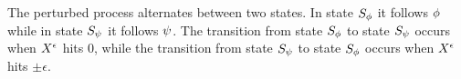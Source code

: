 {{\begin{definition}
  The perturbed process alternates between two states.
  In state $S_{\phi}$ it follows
  $\phi$ while in state $S_{\psi}$ it follows $\psi$.
  The transition from state $S_{\phi}$ to state $S_{\psi}$ occurs
  when $X^{\epsilon}$ hits $0$, while
  the transition from state $S_{\psi}$ to state $S_{\phi}$ occurs when
  $X^{\epsilon}$ hits $\pm \epsilon$.
\end{definition}
}

}

